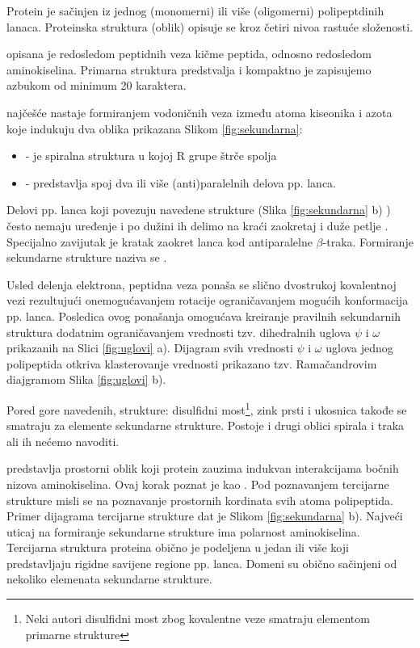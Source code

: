 Protein je sačinjen iz jednog (monomerni) ili više (oligomerni) polipeptdinih lanaca.
Proteinska struktura (oblik) opisuje se kroz četiri nivoa rastuće složenosti.

 opisana je redosledom peptidnih veza kičme peptida,
odnosno redosledom aminokiselina. Primarna struktura predstvalja  i kompaktno je zapisujemo azbukom od minimum 20 karaktera.

 najčešće nastaje formiranjem vodoničnih veza
između atoma kiseonika i azota koje indukuju dva oblika prikazana Slikom \ref{fig:sekundarna}:
\begin{itemize}
  \item {} - je spiralna struktura u kojoj R grupe štrče spolja
  \item {}  - predstavlja spoj dva ili više (anti)paralelnih delova pp. lanca.
\end{itemize}
Delovi pp. lanca  koji povezuju navedene strukture (Slika \ref{fig:sekundarna}
b) ) često nemaju uređenje i po dužini ih delimo na kraći zaokretaj i duže
petlje . Specijalno zavijutak  je
kratak zaokret lanca kod antiparalelne $\beta$-traka.
Formiranje sekundarne strukture naziva se .

Usled delenja elektrona,  peptidna veza ponaša se slično dvostrukoj kovalentnoj
vezi rezultujući onemogućavanjem rotacije ograničavanjem mogućih konformacija pp. lanca.
Posledica ovog ponašanja omogućava kreiranje pravilnih sekundarnih struktura
dodatnim ograničavanjem vrednosti tzv.  dihedralnih uglova $\psi$ i $\omega$ prikazanih
na Slici \ref{fig:uglovi} a).  Dijagram svih vrednosti $\psi$ i $\omega$ uglova
jednog polipeptida otkriva klasterovanje vrednosti prikazano tzv. Ramačandrovim
diajgramom Slika \ref{fig:uglovi} b).

Pored gore navedenih, strukture: disulfidni most\footnote{Neki autori
disulfidni most zbog kovalentne veze smatraju elementom primarne strukture},
zink prsti i ukosnica takođe se smatraju za elemente sekundarne strukture.
Postoje i drugi oblici spirala i traka ali ih nećemo navoditi.




 predstavlja prostorni oblik koji protein zauzima
indukvan interakcijama bočnih nizova aminokiselina. Ovaj korak poznat je kao
 .  Pod poznavanjem tercijarne strukture misli
se na poznavanje prostornih kordinata svih atoma polipeptida. Primer dijagrama
tercijarne strukture dat je Slikom \ref{fig:sekundarna} b).
Najveći uticaj na formiranje sekundarne strukture ima polarnost aminokiselina.
Tercijarna struktura proteina obično je podeljena u jedan ili više
 koji predstavljaju rigidne savijene regione pp. lanca.  Domeni
su obično sačinjeni od nekoliko elemenata sekundarne strukture.

